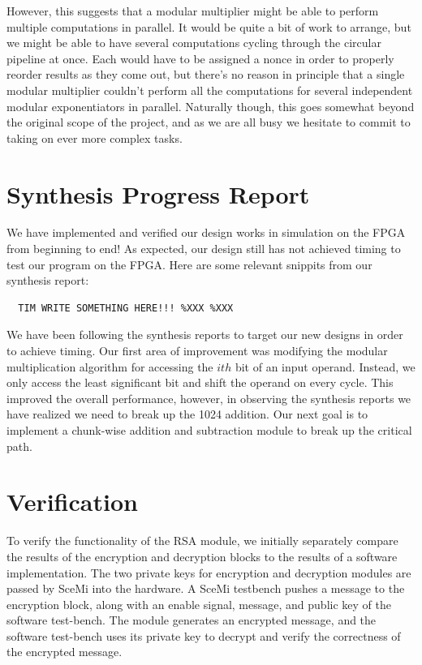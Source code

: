 \documentclass[12pt]{article}
\begin{document}
However, this suggests that a modular multiplier might be able to perform multiple computations in parallel.
It would be quite a bit of work to arrange,
but we might be able to have several computations cycling through the circular pipeline at once.
Each would have to be assigned a nonce in order to properly reorder results as they come out,
but there's no reason in principle that a single modular multiplier couldn't perform all the computations
for several independent modular exponentiators in parallel.
Naturally though, this goes somewhat beyond the original scope of the project,
and as we are all busy we hesitate to commit to taking on ever more complex tasks.
\section{Synthesis Progress Report}
We have implemented and verified our design works in simulation on the FPGA from beginning to end!  As expected, our design still has not achieved timing to test our program on the FPGA.  Here are some relevant snippits from our synthesis report: \
\begin{verbatim}
  TIM WRITE SOMETHING HERE!!! %XXX %XXX
\end{verbatim}

We have been following the synthesis reports to target our new designs in order to achieve timing.  Our first area of improvement was modifying the modular multiplication algorithm for accessing the $ith$ bit of an input operand. Instead, we only access the least significant bit and shift the operand on every cycle. This improved the overall performance, however, in observing the synthesis reports we have realized we need to break up the 1024 addition.  
Our next goal is to implement a chunk-wise addition and subtraction module to break up the critical path.
\section{Verification}
To verify the functionality of the RSA module, we initially separately 
compare the results of the encryption and decryption blocks to the results
of a software implementation. The two private keys for encryption and
decryption modules are passed by SceMi into the hardware. A SceMi testbench
pushes a message to the encryption block, along with an enable signal, message,
and public key of the software test-bench. The module generates an encrypted message,
and the software test-bench uses its private key to decrypt and verify the 
correctness of the encrypted message.
\end{document}
